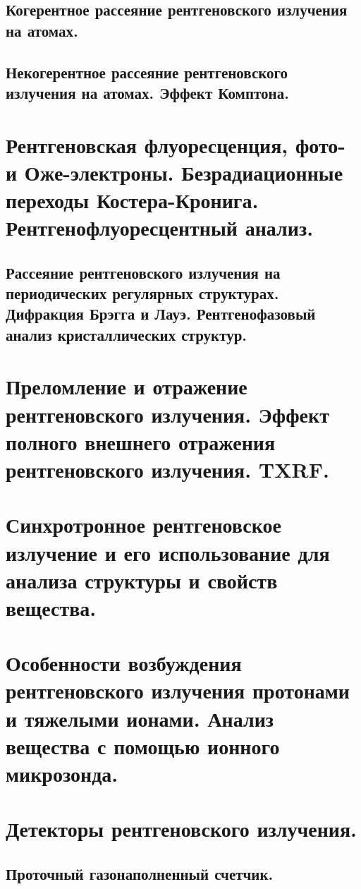 \documentclass[a4paper,14pt, openany, twoside, draft]{extbook} %
\begin{document}
\section{Когерентное рассеяние рентгеновского излучения на атомах.}
\section{Некогерентное рассеяние рентгеновского излучения на атомах. Эффект Комптона.}

\chapter{Рентгеновская флуоресценция, фото- и Оже-электроны. Безрадиационные переходы Костера-Кронига. Рентгенофлуоресцентный анализ.}
\label{cha:xray-analisys}

\section{Рассеяние рентгеновского излучения на периодических регулярных структурах. Дифракция Брэгга и Лауэ. Рентгенофазовый анализ кристаллических структур.}
\label{sec:bragg-diffraction}

\chapter{Преломление и отражение рентгеновского излучения. Эффект полного внешнего отражения рентгеновского излучения. TXRF.}
\label{cha:total-refletction}

\chapter{Синхротронное рентгеновское излучение и его использование для анализа структуры и свойств вещества.}
\label{cha:syncrotron}

\chapter{Особенности возбуждения рентгеновского излучения протонами и тяжелыми ионами. Анализ вещества с помощью ионного микрозонда.}
\label{cha:ion-micro}

\chapter{Детекторы рентгеновского излучения.}
\label{cha:detectors}

\section{Проточный газонаполненный счетчик.}
\end{document}
